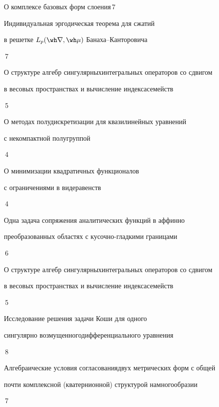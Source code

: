 {О комплексе базовых форм слоения}{\No\,7}




{Индивидуальная эргодическая теорема для сжатий  \newline


в решетке $L_p(\wh\nabla,\wh\mu)$ Банаха--Канторовича}{\No\,7}




{О структуре алгебр сингулярных\newline интегральных операторов со сдвигом


в весовых пространствах и вычисление индекса\newline семейств}{\No\,5}




{О методах полудискретизации для квазилинейных уравнений\newline


с некомпактной полугруппой}{\No\,4}




{О минимизации квадратичных функционалов


с ограничениями в виде\newline равенств}{\No\,4}




{Одна задача сопряжения аналитических функций в аффинно \newline


преобразованных областях с кусочно-гладкими границами}{\No\,6}




{О структуре алгебр сингулярных\newline интегральных операторов со сдвигом


в весовых пространствах и вычисление индекса\newline семейств}{\No\,5}




{Исследование решения задачи Коши для одного


сингулярно возмущенного\newline дифференциального уравнения}{\No\,8}




{Алгебраические условия согласования\newline двух метрических форм с общей


почти комплексной (кватернионной) структурой на\newline многообразии}{\No\,7}


